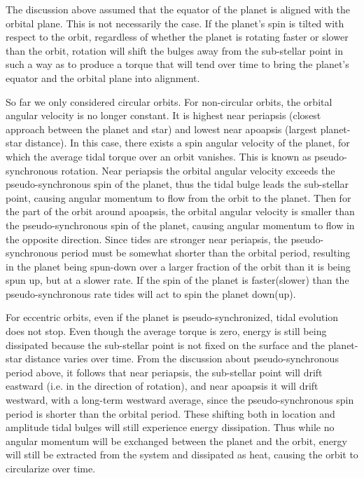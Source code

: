 The discussion above assumed that the equator of the planet is aligned with the
orbital plane. This is not necessarily the case. If the planet's spin is tilted
with respect to the orbit, regardless of whether the planet is rotating faster
or slower than the orbit, rotation will shift the bulges away from the
sub-stellar point in such a way as to produce a torque that will tend over time
to bring the planet's equator and the orbital plane into alignment.

So far we only considered circular orbits. For non-circular orbits, the orbital
angular velocity is no longer constant. It is highest near periapsis (closest
approach between the planet and star) and lowest near apoapsis (largest
planet-star distance). In this case, there exists a spin angular velocity of the
planet, for which the average tidal torque over an orbit vanishes. This is known
as pseudo-synchronous rotation. Near periapsis the orbital angular velocity
exceeds the pseudo-synchronous spin of the planet, thus the tidal bulge leads
the sub-stellar point, causing angular momentum to flow from the orbit to the
planet. Then for the part of the orbit around apoapsis, the orbital angular
velocity is smaller than the pseudo-synchronous spin of the planet, causing
angular momentum to flow in the opposite direction. Since tides are stronger
near periapsis, the pseudo-synchronous period must be somewhat shorter than the
orbital period, resulting in the planet being spun-down over a larger fraction
of the orbit than it is being spun up, but at a slower rate. If the spin of the
planet is faster(slower) than the pseudo-synchronous rate tides will act to spin
the planet down(up).

For eccentric orbits, even if the planet is pseudo-synchronized, tidal evolution
does not stop. Even though the average torque is zero, energy is still being
dissipated because the sub-stellar point is not fixed on the surface and the
planet-star distance varies over time. From the discussion about
pseudo-synchronous period above, it follows that near periapsis, the sub-stellar
point will drift eastward (i.e. in the direction of rotation), and near apoapsis
it will drift westward, with a long-term westward average, since the
pseudo-synchronous spin period is shorter than the orbital period. These
shifting both in location and amplitude tidal bulges will still experience
energy dissipation. Thus while no angular momentum will be exchanged between the
planet and the orbit, energy will still be extracted from the system and
dissipated as heat, causing the orbit to circularize over time.

